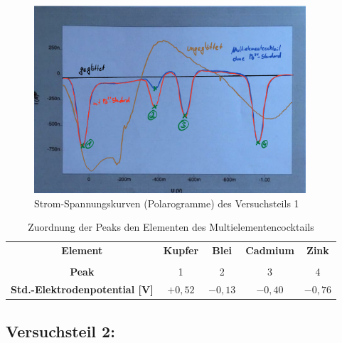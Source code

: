  \begin{figure}[h!]
 	\centering
 	\includegraphics[width=0.9\textwidth]{img/Daten_farbig2}
 	\caption{Strom-Spannungskurven (Polarogramme) des Versuchsteils 1}
 	\label{fig:daten_farbig}
 \end{figure}
 \FloatBarrier
 \vspace*{-2.5mm}
 \renewcommand{\arraystretch}{1.2}
 \begin{table}[h!]
 	\centering
 	\caption{Zuordnung der Peaks den Elementen des Multielementencocktails}
 	\label{tab:peaks}
 	\begin{tabulary}{\textwidth}{|C|C|C|C|C|}
 		\hline
 		\textbf{Element} &  \textbf{Kupfer}  &\textbf{Blei}& \textbf{Cadmium} & \textbf{Zink}\\ 
 	&&&&\\
 		\hline
 		\textbf{Peak} &1&2&3&4\\
 		\hline
 		\textbf{Std.-Elektrodenpotential [V]}&$+0,52$&$-0,13$&$-0,40$&$-0,76$\\
 		\hline
 	\end{tabulary}
 \end{table}
 \FloatBarrier
 \vspace*{-2.5mm}
 
 
\newpage
 
 \subsection{Versuchsteil 2:}

